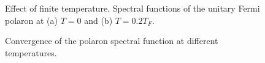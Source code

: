 \begin{figure}[h]
	\centering
	\caption[Effect of finite temperature]{Effect of finite temperature. Spectral functions of the unitary Fermi polaron at (a) $T=0$ and (b) $T=0.2T_F$.}
	\label{fig:effect-finite-temperature}
\end{figure}

\newpage

\begin{figure}[h]
	\centering
	\caption[Convergence of polaron spectral function at different temperatures]{Convergence of the polaron spectral function at different temperatures.}
	\label{fig:impurity-convergence}
\end{figure}


